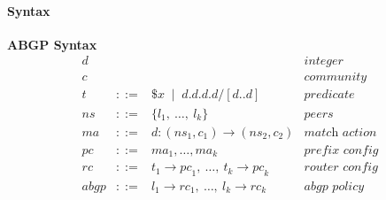 \documentclass[twocolumn, openany]{sig-alternate-10pt}
\newcommand{\para}[1]{\paragraph*{\textbf{#1}}}
\newcommand{\BNFALT}{\;\;|\;\;}
\newcommand{\hdr}[2]{\flushleft \chdr{\hspace{5mm}#1}{#2}}
\newcommand{\chdr}[2]{\textbf{#1} {#2} \\ \centering}%
\begin{document}
\para{Syntax}


\newcommand{\Con}{\text{con}}
\newcommand{\Pfx}{\mathit{pfx}}%

\vspace{2em}
\begin{figure*}[t!]\small%
  
  \hrulefill%

  \vspace{1em}%
  \begin{minipage}[t]{.46\linewidth}
  \hdr{ABGP Syntax}{}
  \vspace*{-1\baselineskip}
  \[ \begin{array}{rclr}
     d    &   & & \textit{integer} \\
     c    &   & & \textit{community} \\
     t    &::=& \$x \BNFALT d.d.d.d/[d..d] & \textit{predicate} \\
     ns   &::=& \{ l_1, ~\dots,~ l_k \} & \textit{peers} \\
     ma   &::=& d : ({ns}_1, c_1) \rightarrow ({ns}_2, c_2) & \textit{match action} \\
     pc   &::=& ma_1, \dots, ma_k & \textit{prefix config} \\
     rc   &::=& t_1 \rightarrow {pc}_1, ~\dots,~ t_k \rightarrow {pc}_k & \textit{router config} \\
     abgp &::=& l_1 \rightarrow {rc}_1, ~\dots,~ l_k \rightarrow {rc}_k & \textit{abgp policy} \\%
  \end{array} \]%


\end{minipage}
\end{figure*}
\end{document}
